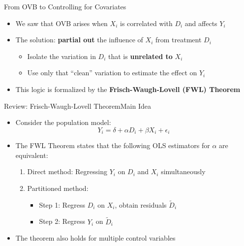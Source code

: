 \documentclass[dvipsnames,hyperref={pdfpagelabels=false}]{beamer}
\begin{document}
\begin{frame}{From OVB to Controlling for Covariates}
	\begin{itemize}
		\item We saw that OVB arises when $X_i$ is correlated with $D_i$ and affects $Y_i$
		\vspace{0.3cm}
		\item The solution: \textbf{partial out} the influence of $X_i$ from treatment $D_i$
		\vspace{0.3cm}
		\begin{itemize}
			\item Isolate the variation in $D_i$ that is \textbf{unrelated to} $X_i$
			\vspace{0.2cm}
			\item Use only that ``clean'' variation to estimate the effect on $Y_i$
		\end{itemize}
		\vspace{0.3cm}
		\item This logic is formalized by the \textbf{Frisch-Waugh-Lovell (FWL) Theorem}
	\end{itemize}
\end{frame}



       \begin{frame}{Review: Frisch-Waugh-Lovell Theorem}{Main Idea}
       	\begin{itemize}
       		\item Consider the population model:
       		\begin{equation*}
       			Y_i = \delta + \alpha D_i + \beta X_i + \epsilon_i
       		\end{equation*}
       		
       		\item The FWL Theorem states that the following OLS estimators for $\alpha$ are equivalent:
       		\vspace{0.2cm}
       		\begin{enumerate}
       			\item Direct method: Regressing $Y_i$ on $D_i$ and $X_i$ simultaneously
       			       		\vspace{0.2cm}
       			\item Partitioned method:
       			       		\vspace{0.2cm}
       			\begin{itemize}
       				\item Step 1: Regress $D_i$ on $X_i$, obtain residuals $\tilde{D}_i$
       				       		\vspace{0.2cm}
       				\item Step 2: Regress $Y_i$ on $\tilde{D}_i$
       				       		\vspace{0.2cm}
       			\end{itemize}
       		\end{enumerate}
       		
       		\item The theorem also holds for multiple control variables 
       	\end{itemize}
       \end{frame}
       
\end{document}
